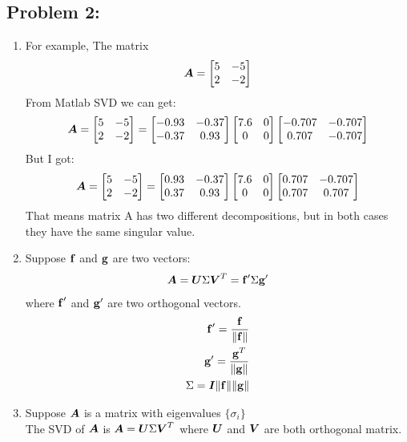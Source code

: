 \documentclass{article}
\begin{document}
\hypertarget{}{}
\subsection*{{Problem 2: }}
\label{problem_0_homework_checklist_2}

\begin{enumerate}

\item 
For example, The matrix \\
\begin{align} 
\mA = \bmat{5 &-5 \\ 2 & -2} 
\end{align}
From Matlab SVD we can get: 
\begin{align} 
\mA =\bmat{5 & -5 \\ 2 & -2}= \bmat{-0.93 & -0.37  \\ -0.37 & 0.93   }\bmat{7.6 & 0 \\ 0 & 0 }
\bmat{-0.707 & -0.707 \\ 0.707 & -0.707 } 
\end{align}
But I got: 
\begin{align} 
\mA = \bmat{5 & -5 \\ 2 & -2}= \bmat{0.93 & -0.37  \\ 0.37 & 0.93   }\bmat{7.6 & 0 \\ 0 & 0  }
\bmat{0.707 & -0.707 \\ 0.707 & 0.707 } 
\end{align}
That means matrix A has two different  decompositions, but in both cases they have the same singular value. \\
\item 
Suppose $\vf$ and $\vg$ are two vectors:  \\
\begin{align}
\mA = \mU \Sigma \mV ^T = \vf' \Sigma \vg'
\end{align}
 where $\vf'$ and $\vg'$ are two orthogonal vectors. 
 \begin{align}    
\vf' = \frac{\vf}{\|\vf\|}\\
\vg' = \frac{\vg^T}{\|\vg\|}\\  
\Sigma = \mI \|\vf\|\|\vg\|
 \end{align}  

\item 
Suppose $\mA$ is a matrix with eigenvalues $\{\sigma_i\}$\\
The SVD of $\mA$ is $\mA=\mU \Sigma\mV^T $ where $\mU$ and $\mV$ are both orthogonal matrix. 


\end{enumerate}
\end{document}
